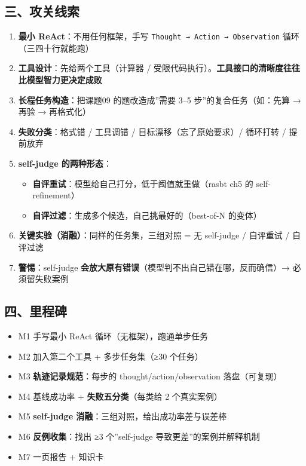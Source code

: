 \documentclass[
  chinese,
  11pt,
]{ctexart}
\providecommand{\tightlist}{%
  \setlength{\itemsep}{0pt}\setlength{\parskip}{0pt}}
\begin{document}
\subsection{三、攻关线索}\label{ux4e09ux653bux5173ux7ebfux7d22-8}

\begin{enumerate}
\def\labelenumi{\arabic{enumi}.}
\tightlist
\item
  \textbf{最小 ReAct}：不用任何框架，手写 \texttt{Thought\ →\ Action\ →\ Observation} 循环（三四十行就能跑）
\item
  \textbf{工具设计}：先给两个工具（计算器 / 受限代码执行）。\textbf{工具接口的清晰度往往比模型智力更决定成败}
\item
  \textbf{长程任务构造}：把课题09 的题改造成''需要 3--5 步''的复合任务（如：先算 → 再验 → 再格式化）
\item
  \textbf{失败分类}：格式错 / 工具调错 / 目标漂移（忘了原始要求）/ 循环打转 / 提前放弃
\item
  \textbf{self-judge 的两种形态}：

  \begin{itemize}
  \tightlist
  \item
    \textbf{自评重试}：模型给自己打分，低于阈值就重做（rasbt ch5 的 self-refinement）
  \item
    \textbf{自评过滤}：生成多个候选，自己挑最好的（best-of-N 的变体）
  \end{itemize}
\item
  \textbf{关键实验（消融）}：同样的任务集，三组对照 = 无 self-judge / 自评重试 / 自评过滤
\item
  \textbf{警惕}：self-judge \textbf{会放大原有错误}（模型判不出自己错在哪，反而确信）→ 必须留失败案例
\end{enumerate}

\subsection{四、里程碑}\label{ux56dbux91ccux7a0bux7891-8}

\begin{itemize}
\tightlist
\item[$\square$]
  M1 手写最小 ReAct 循环（无框架），跑通单步任务
\item[$\square$]
  M2 加入第二个工具 + 多步任务集（≥30 个任务）
\item[$\square$]
  M3 \textbf{轨迹记录规范}：每步的 thought/action/observation 落盘（可复现）
\item[$\square$]
  M4 基线成功率 + \textbf{失败五分类}（每类给 2 个真实案例）
\item[$\square$]
  M5 \textbf{self-judge 消融}：三组对照，给出成功率差与误差棒
\item[$\square$]
  M6 \textbf{反例收集}：找出 ≥3 个''self-judge 导致更差''的案例并解释机制
\item[$\square$]
  M7 一页报告 + 知识卡
\end{itemize}
\end{document}
